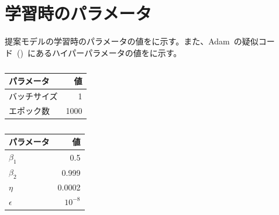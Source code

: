 \appendix
\chapter{学習時のパラメータ}
\label{app:params}

提案モデルの学習時のパラメータの値をに示す。また、Adam~\cite{Adam}の疑似コード~()~にあるハイパーパラメータの値をに示す。

\begin{table}[b]
\centering
\begin{minipage}{0.49\hsize}
    \centering
        \begin{tabular}{lr}\toprule
            パラメータ & 値 \\ \midrule
            バッチサイズ & 1 \\ 
            エポック数 & 1000 \\ \bottomrule
        \end{tabular}
    \caption{}
    \label{tab:params1}
\end{minipage}
\begin{minipage}{0.49\hsize}
    \centering
        \begin{tabular}{lr}\toprule
            パラメータ & 値 \\ \midrule
            $\beta_1$ & 0.5 \\
            $\beta_2$ & 0.999 \\
            $\eta$ & 0.0002 \\ 
            $\epsilon$ & $10^{-8}$ \\ \bottomrule
        \end{tabular}
    \caption{}
    \label{tab:params2}
\end{minipage}
\end{table}

